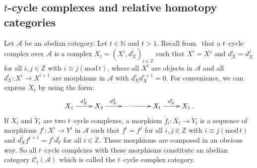 \documentclass{amsart}
\theoremstyle{definition}
\numberwithin{equation}{section}
\begin{document}
\subsection{$t$-cycle complexes and relative homotopy categories}

Let $\mathcal{A}$ be an abelian category. Let $t\in {{\mathbb N}}$ and $t>1.$
Recall from~\cite{PX1997} that a $t$--cycle complex over
$\mathcal{A}$ is a complex $\dot{X}_t=(X^i, d_X^i )_{i\in
\mathbb{Z}}$ such that $X^i=X^j$  and $d_X^i=d_X^j$ for all $i, j
\in \mathbb{Z}$ with $i \equiv j ({{\text{mod}}}\, t)$, where all $X^i$ are
objects in $\mathcal{A}$ and all $d_X^i: X^i \longrightarrow
X^{i+1}$ are morphisms in $\mathcal{A}$ with $ d_X^i d_X^{i+1}=0$.
For convenience, we can express $\dot{X}_t$ by using the form:
$$
\xymatrix{X_1\ar[r]^{d_X^1}&X_2\ar[r]^{d_X^2}&\cdots\ar[r]&X_t\ar[r]^{d_X^t}&X_1}.
$$  If
$\dot{X}_t$ and $\dot{Y}_t$ are two $t$--cycle complexes, a morphism
$\dot{f}_t: \dot{X}_t \longrightarrow \dot{Y}_t$ is a sequence of
morphisms $f^i: X^i \longrightarrow Y^i$ in $\mathcal{A}$ such that
$f^i=f^j$ for all $i, j \in \mathbb{Z}$ with $i \equiv j ({{\text{mod}}}\,
t)$ and $d_X^i f^{i+1}=f^id_Y^i$ for all $i \in \mathbb{Z}$. These
morphisms are composed in an obvious way. So all $t$--cycle
complexes with these morphisms constitute an abelian category
$\mathcal{C}_t (\mathcal{A})$ which is called the $t$--cycle complex
category.
\end{document}
